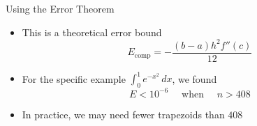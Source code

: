 \documentclass[10pt]{beamer}
\begin{document}
\begin{frame}{Using the Error Theorem}

\begin{itemize}
    \item This is a theoretical error bound 
        $$E_{\textrm{comp}} = -\frac{(b-a) h^2 f''(c)}{12}$$

    \item For the specific example $\int_0^1 e^{-x^2}\,dx$, we found 
    $$
        E < 10^{-6} \quad\text{ when }\quad n>408 
    $$
    \item In practice, we may need fewer trapezoids than $408$

\end{itemize}
    
\end{frame}
\end{document}

